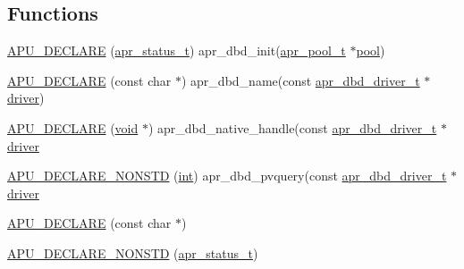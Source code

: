 \subsection*{Functions}
\begin{DoxyCompactItemize}
\item 
\hyperlink{group__APR__Util__DBD_ga5ac60f67f1f9131b053e3828397752de}{A\+P\+U\+\_\+\+D\+E\+C\+L\+A\+RE} (\hyperlink{group__apr__errno_gaa5105fa83cc322f09382292db8b47593}{apr\+\_\+status\+\_\+t}) apr\+\_\+dbd\+\_\+init(\hyperlink{structapr__pool__t}{apr\+\_\+pool\+\_\+t} $\ast$\hyperlink{group__APR__XLATE_gabb3cd978f04c73d0b763c391e9bfde73}{pool})
\item 
\hyperlink{group__APR__Util__DBD_ga26e40c606585283e84a7ae6179591889}{A\+P\+U\+\_\+\+D\+E\+C\+L\+A\+RE} (const char $\ast$) apr\+\_\+dbd\+\_\+name(const \hyperlink{structapr__dbd__driver__t}{apr\+\_\+dbd\+\_\+driver\+\_\+t} $\ast$\hyperlink{group__APR__Util__DBD_ga13380de2c65258ceb1b4a477f536d0ce}{driver})
\item 
\hyperlink{group__APR__Util__DBD_ga58996e2d6cea54891bbe055f6b5e9d58}{A\+P\+U\+\_\+\+D\+E\+C\+L\+A\+RE} (\hyperlink{group__MOD__ISAPI_gacd6cdbf73df3d9eed42fa493d9b621a6}{void} $\ast$) apr\+\_\+dbd\+\_\+native\+\_\+handle(const \hyperlink{structapr__dbd__driver__t}{apr\+\_\+dbd\+\_\+driver\+\_\+t} $\ast$\hyperlink{group__APR__Util__DBD_ga13380de2c65258ceb1b4a477f536d0ce}{driver}
\item 
\hyperlink{group__APR__Util__DBD_gac62a2cd2b097528975dfe8b1902dfa32}{A\+P\+U\+\_\+\+D\+E\+C\+L\+A\+R\+E\+\_\+\+N\+O\+N\+S\+TD} (\hyperlink{pcre_8txt_a42dfa4ff673c82d8efe7144098fbc198}{int}) apr\+\_\+dbd\+\_\+pvquery(const \hyperlink{structapr__dbd__driver__t}{apr\+\_\+dbd\+\_\+driver\+\_\+t} $\ast$\hyperlink{group__APR__Util__DBD_ga13380de2c65258ceb1b4a477f536d0ce}{driver}
\item 
\hyperlink{group__APR__Util__DBD_gaabdaed594e0b10e75f40a6fe65511e9c}{A\+P\+U\+\_\+\+D\+E\+C\+L\+A\+RE} (const char $\ast$)
\item 
\hyperlink{group__APR__Util__DBD_ga2f52ba8a30c995de5999498c8314805f}{A\+P\+U\+\_\+\+D\+E\+C\+L\+A\+R\+E\+\_\+\+N\+O\+N\+S\+TD} (\hyperlink{group__apr__errno_gaa5105fa83cc322f09382292db8b47593}{apr\+\_\+status\+\_\+t})
\end{DoxyCompactItemize}
